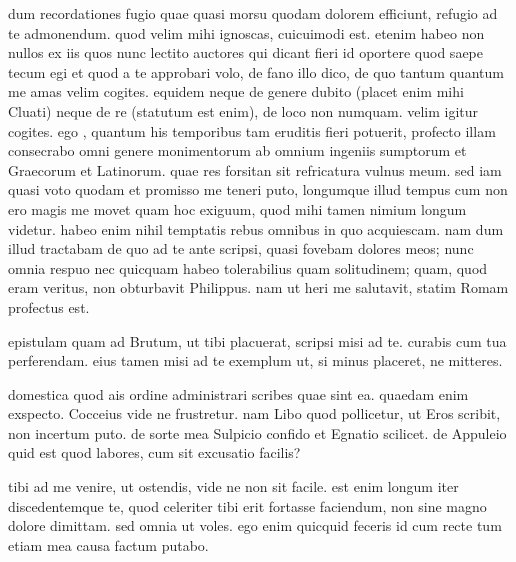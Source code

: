 


 dum recordationes fugio quae quasi morsu quodam dolorem efficiunt, refugio ad te admonendum. quod velim mihi ignoscas, cuicuimodi est. etenim habeo non nullos ex iis quos nunc lectito auctores qui dicant fieri id oportere quod saepe tecum egi et quod a te approbari volo, de fano illo dico, de quo tantum quantum me amas velim cogites. equidem neque de genere dubito (placet enim mihi Cluati) neque de re (statutum est enim), de loco non numquam. velim igitur cogites. ego , quantum his temporibus tam eruditis fieri potuerit, profecto illam consecrabo omni genere monimentorum ab omnium ingeniis sumptorum et Graecorum et Latinorum. quae res forsitan sit refricatura vulnus meum. sed iam quasi voto quodam et promisso me teneri puto, longumque illud tempus cum non ero magis me movet quam hoc exiguum, quod mihi tamen nimium longum videtur. habeo enim nihil temptatis rebus omnibus in quo acquiescam. nam dum illud tractabam de quo ad te ante scripsi, quasi fovebam dolores meos; nunc omnia respuo nec quicquam habeo tolerabilius quam solitudinem; quam, quod eram veritus, non obturbavit Philippus. nam ut heri me salutavit, statim Romam profectus est.

 epistulam quam ad Brutum, ut tibi placuerat, scripsi misi ad te. curabis cum tua perferendam. eius tamen misi ad te exemplum ut, si minus placeret, ne mitteres.

 domestica quod ais ordine administrari scribes quae sint ea. quaedam enim exspecto. Cocceius vide ne frustretur. nam Libo quod pollicetur, ut Eros scribit, non incertum puto. de sorte mea Sulpicio confido et Egnatio scilicet. de Appuleio quid est quod labores, cum sit excusatio facilis?

 tibi ad me venire, ut ostendis, vide ne non sit facile. est enim longum iter discedentemque te, quod celeriter tibi erit fortasse faciendum, non sine magno dolore dimittam. sed omnia ut voles. ego enim quicquid feceris id cum recte tum etiam mea causa factum putabo.
